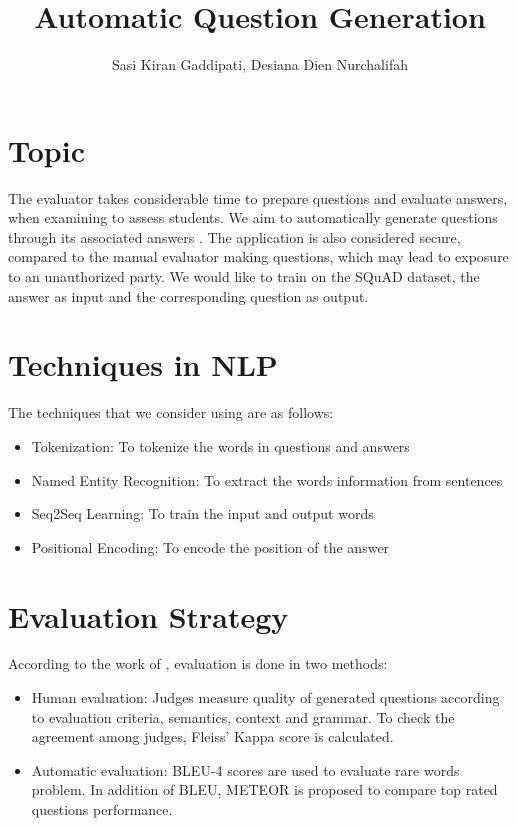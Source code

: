 \documentclass[a4paper, 11pt]{article}
\title{\vspace{-1cm}Automatic Question Generation}
\author{Sasi Kiran Gaddipati, Desiana Dien Nurchalifah}
\begin{document}
\maketitle
\section{Topic}
	The evaluator takes considerable time to prepare questions and evaluate answers, when examining to assess students. We aim to automatically generate questions through its associated answers \cite{zhou2017neural}. The application is also considered secure, compared to the manual evaluator making questions, which may lead to exposure to an unauthorized party. We would like to train on the SQuAD dataset, the answer as input and the corresponding question as output.

\section{Techniques in NLP}
The techniques that we consider using are as follows:
\begin{itemize}
	\setlength{\itemsep}{1pt}
	\item Tokenization: To tokenize the words in questions and answers
	\item Named Entity Recognition: To extract the words information from sentences
	\item Seq2Seq Learning: To train the input and output words
	\item Positional Encoding: To encode the position of the answer
	
\end{itemize}

\section{Evaluation Strategy}
	According to the work of \cite{zhou2017neural}, evaluation is done in two methods:
	\begin{itemize}
		\item Human evaluation: Judges measure quality of generated questions according to evaluation criteria, semantics, context and grammar. To check the agreement among judges, Fleiss' Kappa score \cite{fleiss1971measuring} is calculated.
		\item Automatic evaluation: BLEU-4 scores are used to evaluate rare words problem. In addition of BLEU, METEOR\cite{banerjee-lavie-2005-meteor} is proposed to compare top rated questions performance.
	\end{itemize}


\end{document}
